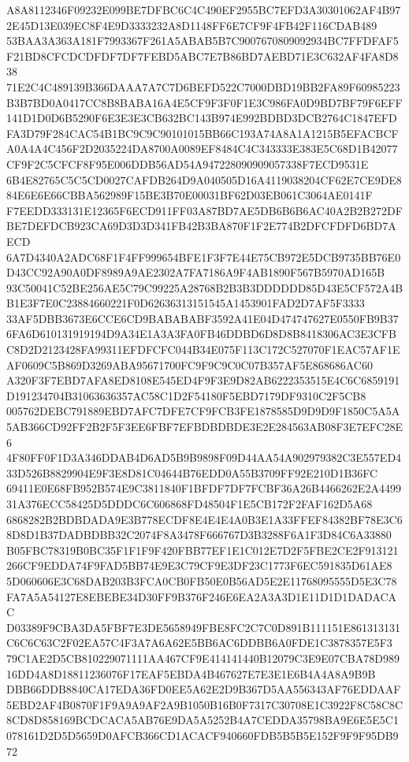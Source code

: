 \documentclass[UTF8,fontset=fandol,zihao=-4,a4paper]{ctexart}
\begin{document}
{{A8A8112346F09232E099BE7DFBC6C4C490EF2955BC7EFD3A30301062AF4B972E45D13E039EC8F4E9D3333232A8D1148FF6E7CF9F4FB42F116CDAB489
53BAA3A363A181F7993367F261A5ABAB5B7C9007670809092934BC7FFDFAF5F21BD8CFCDCDFDF7DF7FEBD5ABC7E7B86BD7AEBD71E3C632AF4FA8D838
71E2C4C489139B366DAAA7A7C7D6BEFD522C7000DBD19BB2FA89F60985223B3B7BD0A0417CC8B8BABA16A4E5CF9F3F0F1E3C986FA0D9BD7BF79F6EFF
141D1D0D6B5290F6E3E3E3CB632BC143B974E992BDBD3DCB2764C1847EFDFA3D79F284CAC54B1BC9C9C90101015BB66C193A74A8A1A1215B5EFACBCF
A0A4A4C456F2D2035224DA8700A0089EF8484C4C343333E383E5C68D1B42077CF9F2C5CFCF8F95E006DDB56AD54A947228090909057338F7ECD9531E
6B4E82765C5C5CD0027CAFDB264D9A040505D16A4119038204CF62E7CE9DE884E6E6E66CBBA562989F15BE3B70E00031BF62D03EB061C3064AE0141F
F7EEDD333131E12365F6ECD911FF03A87BD7AE5DB6B6B6AC40A2B2B272DFBE7DEFDCB923CA69D3D3D341FB42B3BA870F1F2E774B2DFCFDFD6BD7AECD
6A7D4340A2ADC68F1F4FF999654BFE1F3F7E44E75CB972E5DCB9735BB76E0D43CC92A90A0DF8989A9AE2302A7FA7186A9F4AB1890F567B5970AD165B
93C50041C52BE256AE5C79C99225A28768B2B3B3DDDDDD85D43E5CF572A4BB1E3F7E0C23884660221F0D62636313151545A1453901FAD2D7AF5F3333
33AF5DBB3673E6CCE6CD9BABABABF3592A41E04D474747627E0550FB9B376FA6D610131919194D9A34E1A3A3FA0FB46DDBD6D8D8B8418306AC3E3CFB
C8D2D2123428FA99311EFDFCFC044B34E075F113C172C527070F1EAC57AF1EAF0609C5B869D3269ABA95671700FC9F9C9C0C07B357AF5E868686AC60
A320F3F7EBD7AFA8ED8108E545ED4F9F3E9D82AB6222353515E4C6C6859191D191234704B31063636357AC58C1D2F54180F5EBD7179DF9310C2F5CB8
005762DEBC791889EBD7AFC7DFE7CF9FCB3FE1878585D9D9D9F1850C5A5A5AB366CD92FF2B2F5F3EE6FBF7EFBDBDBDE3E2E284563AB08F3E7EFC28E6
4F80FF0F1D3A346DDAB4D6AD5B9B9898F09D44AA54A902979382C3E557ED433D526B8829904E9F3E8D81C04644B76EDD0A55B3709FF92E210D1B36FC
69411E0E68FB952B574E9C3811840F1BFDF7DF7FCBF36A26B4466262E2A449931A376ECC58425D5DDDC6C606868FD48504F1E5CB172F2FAF162D5A68
6868282B2BDBDADA9E3B778ECDF8E4E4E4A0B3E1A33FFEF84382BF78E3C68D8D1B37DADBDBB32C2074F8A3478F666767D3B3288F6A1F3D84C6A33880
B05FBC78319B0BC35F1F1F9F420FBB77EF1E1C012E7D2F5FBE2CE2F913121266CF9EDDA74F9FAD5BB74E9E3C79CF9E3DF23C1773F6EC591835D61AE8
5D060606E3C68DAB203B3FCA0CB0FB50E0B56AD5E2E11768095555D5E3C78FA7A5A54127E8EBEBE34D30FF9B376F246E6EA2A3A3D1E11D1D1DADACAC
D03389F9CBA3DA5FBF7E3DE5658949FBE8FC2C7C0D891B111151E861313131C6C6C63C2F02EA57C4F3A7A6A62E5BB6AC6DDBB6A0FDE1C3878357E5F3
79C1AE2D5CB810229071111AA467CF9E414141440B12079C3E9E07CBA78D98916DD4A8D18811236076F17EAF5EBDA4B467627E7E3E1E6B4A4A8A9B9B
DBB66DDB8840CA17EDA36FD0EE5A62E2D9B367D5AA556343AF76EDDAAF5EBD2AF4B0870F1F9A9A9AF2A9B1050B16B0F7317C30708E1C3922F8C58C8C
8CD8D858169BCDCACA5AB76E9DA5A5252B4A7CEDDA35798BA9E6E5E5C1078161D2D5D5659D0AFCB366CD1ACACF940660FDB5B5B5E152F9F9F95DB972
}}
\end{document}
